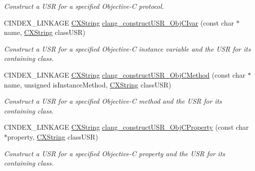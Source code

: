 \begin{DoxyCompactItemize}
\begin{DoxyCompactList}\small\item\em Construct a U\+SR for a specified Objective-\/C protocol. \end{DoxyCompactList}\item 
\mbox{\label{group__CINDEX__CURSOR__XREF_ga91dcb69a0378fcef6d21ac0be6c0038a}} 
C\+I\+N\+D\+E\+X\+\_\+\+L\+I\+N\+K\+A\+GE \hyperlink{structCXString}{C\+X\+String} \hyperlink{group__CINDEX__CURSOR__XREF_ga91dcb69a0378fcef6d21ac0be6c0038a}{clang\+\_\+construct\+U\+S\+R\+\_\+\+Obj\+C\+Ivar} (const char $\ast$name, \hyperlink{structCXString}{C\+X\+String} class\+U\+SR)
\begin{DoxyCompactList}\small\item\em Construct a U\+SR for a specified Objective-\/C instance variable and the U\+SR for its containing class. \end{DoxyCompactList}\item 
\mbox{\label{group__CINDEX__CURSOR__XREF_ga8f3065868eb56e24a6467703fa28a054}} 
C\+I\+N\+D\+E\+X\+\_\+\+L\+I\+N\+K\+A\+GE \hyperlink{structCXString}{C\+X\+String} \hyperlink{group__CINDEX__CURSOR__XREF_ga8f3065868eb56e24a6467703fa28a054}{clang\+\_\+construct\+U\+S\+R\+\_\+\+Obj\+C\+Method} (const char $\ast$name, unsigned is\+Instance\+Method, \hyperlink{structCXString}{C\+X\+String} class\+U\+SR)
\begin{DoxyCompactList}\small\item\em Construct a U\+SR for a specified Objective-\/C method and the U\+SR for its containing class. \end{DoxyCompactList}\item 
\mbox{\label{group__CINDEX__CURSOR__XREF_gac19f0c8de7e33a98723b336472e67e0c}} 
C\+I\+N\+D\+E\+X\+\_\+\+L\+I\+N\+K\+A\+GE \hyperlink{structCXString}{C\+X\+String} \hyperlink{group__CINDEX__CURSOR__XREF_gac19f0c8de7e33a98723b336472e67e0c}{clang\+\_\+construct\+U\+S\+R\+\_\+\+Obj\+C\+Property} (const char $\ast$property, \hyperlink{structCXString}{C\+X\+String} class\+U\+SR)
\begin{DoxyCompactList}\small\item\em Construct a U\+SR for a specified Objective-\/C property and the U\+SR for its containing class. \end{DoxyCompactList}\item 

\end{DoxyCompactItemize}
